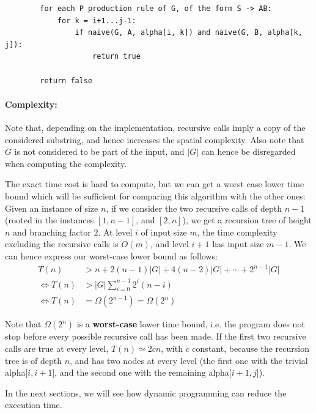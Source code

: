 \documentclass[12pt]{extarticle}
\begin{document}
\begin{multicols}{2}
\begin{lstlisting}
        for each P production rule of G, of the form S -> AB:
            for k = i+1...j-1:
                if naive(G, A, alpha[i, k]) and naive(G, B, alpha[k, j]):
                    return true

        return false
\end{lstlisting}

\paragraph{Complexity:}
Note that, depending on the implementation, recursive calls imply a copy of the
considered substring, and hence increases the spatial complexity. Also note that $G$ is not
considered to be part of the input, and $|G|$ can hence be disregarded when
computing the complexity.

The exact time cost is hard to compute, but we can get a worst case lower time bound which
will be sufficient for comparing this algorithm with the other ones:\\
Given an instance of size $n$, if we consider the two recursive calls of depth
$n-1$ (rooted in the instances $[1, n-1]$, and $[2, n]$), we get a recursion
tree of height $n$ and branching factor $2$. At level $i$ of input size $m$,
the time complexity excluding the recursive calls is $O(m)$, and level $i+1$ has
input size $m-1$. We can
hence express our worst-case lower bound as follows:\\
\begin{align*}
  T(n) &> n+2(n-1)|G|+4(n-2)|G|+\cdots +2^{n-1}|G|\\
  \Leftrightarrow T(n) &>|G|\displaystyle\sum_{i=0}^{n-1}2^i(n-i)\\
  \Leftrightarrow T(n) &=\Omega(2^{n-1})=\Omega(2^n)
\end{align*}

Note that $\Omega(2^n)$ is a \textbf{worst-case} lower time bound, i.e. the program does not
stop before every possible recursive call has been made. If the first two recursive
calls are true at every level, $T(n)\simeq 2cn$, with $c$ constant, because the
recursion tree is of depth $n$, and has two nodes at every level (the first one
with the trivial alpha[$i,i+1$], and the second one with the remaining alpha[$i+1,j$]).

In the next sections, we will see how dynamic programming can reduce the execution time.


\end{multicols}
\end{document}
